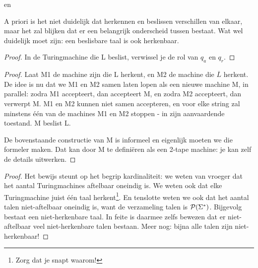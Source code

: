 en



A priori is het niet duidelijk dat herkennen en beslissen verschillen
van elkaar, maar het zal blijken dat er een belangrijk onderscheid
tussen bestaat. Wat wel duidelijk moet zijn: een beslisbare taal is
ook herkenbaar.



\begin{proof}
In de Turingmachine die L beslist, verwissel je de rol van $q_a$ en
$q_r$.
\end{proof}

\begin{proof}
Laat M1 de machine zijn die L herkent, en M2 de machine die $\overline{L}$
herkent. De idee is nu dat we M1 en M2 samen laten lopen als een
nieuwe machine M, in parallel: zodra M1 accepteert, dan accepteert M,
en zodra M2 accepteert, dan verwerpt M. M1 en M2 kunnen niet samen
accepteren, en voor elke string zal minstens \'{e}\'{e}n van de
machines M1 en M2 stoppen - in zijn aanvaardende toestand. M beslist L.


De bovenstaande constructie van M is informeel en eigenlijk moeten we
die formeler maken. Dat kan door M te defini\"eren als een 2-tape
machine: je kan zelf de details uitwerken.
\end{proof}


\begin{proof}
Het bewijs steunt op het begrip kardinaliteit: we weten van vroeger
dat het aantal Turingmachines aftelbaar oneindig is. We weten ook dat
elke Turingmachine juist \'{e}\'{e}n taal herkent\footnote{Zorg dat je
snapt waarom!}. En tenslotte weten we ook dat het aantal talen
niet-aftelbaar oneindig is, want de verzameling talen is ${\cal
P}(\Sigma^*)$. Bijgevolg bestaat een niet-herkenbare taal. In feite
is daarmee zelfs bewezen dat er niet-aftelbaar veel niet-herkenbare
talen bestaan. Meer nog: bijna alle talen zijn niet-herkenbaar!
\end{proof}



